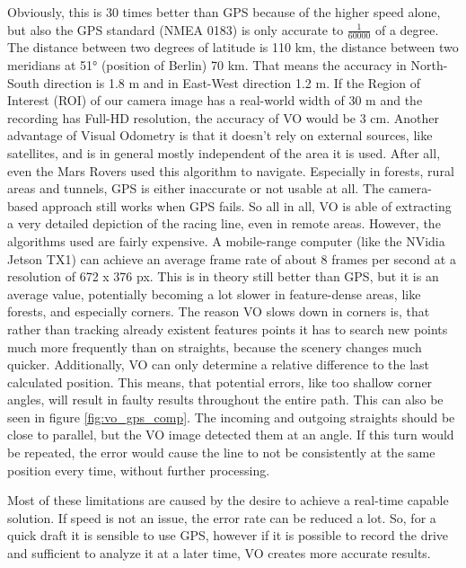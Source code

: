 Obviously, this is 30 times better than GPS because of the higher speed alone, but also the GPS standard (NMEA 0183) is only accurate to $\frac{1}{60 000}$ of a degree. The distance between two degrees of latitude is 110 km, the distance between two meridians at 51° (position of Berlin) 70 km. That means the accuracy in North-South direction is 1.8 m and in East-West direction 1.2 m. If the Region of Interest (ROI) of our camera image has a real-world width of 30 m and the recording has Full-HD resolution, the accuracy of VO would be 3 cm.
Another advantage of Visual Odometry is that it doesn't rely on external sources, like satellites, and is in general mostly independent of the area it is used. After all, even the Mars Rovers used this algorithm to navigate. Especially in forests, rural areas and tunnels, GPS is either inaccurate or not usable at all. The camera-based approach still works when GPS fails.
So all in all, VO is able of extracting a very detailed depiction of the racing line, even in remote areas. However, the algorithms used are fairly expensive.
A mobile-range computer (like the NVidia Jetson TX1) can achieve an average frame rate of about 8 frames per second at a resolution of 672 x 376 px. This is in theory still better than GPS, but it is an average value, potentially becoming a lot slower in feature-dense areas, like forests, and especially corners. The reason VO slows down in corners is, that rather than tracking already existent features points it has to search new points much more frequently than on straights, because the scenery changes much quicker.
Additionally, VO can only determine a relative difference to the last calculated position. This means, that potential errors, like too shallow corner angles, will result in faulty results throughout the entire path. This can also be seen in figure \ref{fig:vo_gps_comp}. The incoming and outgoing straights should be close to parallel, but the VO image detected them at an angle. If this turn would be repeated, the error would cause the line to not be consistently at the same position every time, without further processing.

Most of these limitations are caused by the desire to achieve a real-time capable solution. If speed is not an issue, the error rate can be reduced a lot. So, for a quick draft it is sensible to use GPS, however if it is possible to record the drive and sufficient to analyze it at a later time, VO creates more accurate results. 

